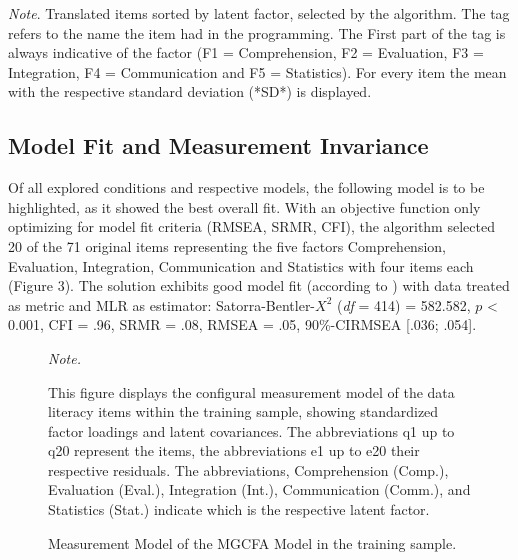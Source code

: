 \documentclass[
  12pt,
  a4paper,
  twoside]{article}
\begin{document}
\begin{table}[htpb]
\vspace{10pt}
\small\textit{Note}. Translated items sorted by latent factor, selected by the algorithm. 
The tag refers to the name the item had in the programming. The First part of the tag is always indicative of the factor (F1 = Comprehension, F2 = Evaluation, F3 = Integration, F4 = Communication and F5 = Statistics). For every item the mean with the respective standard deviation (*SD*) is displayed.
\end{table}

\subsection{Model Fit and Measurement Invariance}\label{model-fit-and-measurement-invariance}

Of all explored conditions and respective models, the following model is to be highlighted, as it showed the best overall fit.
With an objective function only optimizing for model fit criteria (RMSEA, SRMR, CFI), the algorithm selected 20 of the 71 original items representing the five factors Comprehension, Evaluation, Integration, Communication and Statistics with four items each (Figure 3). The solution exhibits good model fit (according to ) with data treated as metric and MLR as estimator: Satorra-Bentler-\(X^{2}\) (\emph{df} = 414) = 582.582, \(p\) \textless{} 0.001, CFI = .96, SRMR = .08, RMSEA = .05, 90\%-CIRMSEA {[}.036; .054{]}.

\vspace{0.3cm}
\begin{figure}
    \centering
    \caption{Measurement Model of the MGCFA Model in the training sample.}
    \small 
    \textit{Note.} \raggedright This figure displays the configural measurement model of the data literacy items within the training sample, showing standardized factor loadings and latent covariances. The abbreviations q1 up to q20 represent the items, the abbreviations e1 up to e20 their respective residuals. The abbreviations, Comprehension (Comp.), Evaluation (Eval.), Integration (Int.), Communication (Comm.), and Statistics (Stat.) indicate which is the respective latent factor.
\end{figure}
\vspace{0.3cm}
\end{document}
